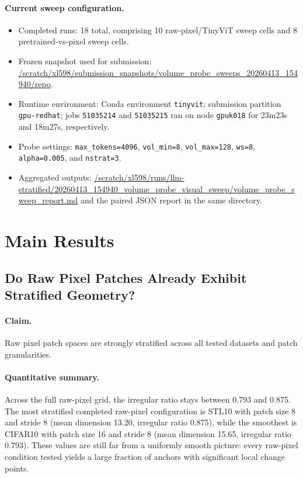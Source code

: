 \documentclass{article}
\newcommand{\dataset}[1]{\textsc{#1}}
\theoremstyle{definition}
\theoremstyle{plain}
\theoremstyle{remark}
\begin{document}
\paragraph{Current sweep configuration.}
\begin{itemize}[leftmargin=1.5em]
\item Completed runs: 18 total, comprising 10 raw-pixel/TinyViT sweep cells and 8 pretrained-vs-pixel sweep cells.
\item Frozen snapshot used for submission: \url{/scratch/xl598/submission_snapshots/volume_probe_sweeps_20260413_154940/repo}.
\item Runtime environment: Conda environment \texttt{tinyvit}; submission partition \texttt{gpu-redhat}; jobs \texttt{51035214} and \texttt{51035215} ran on node \texttt{gpuk018} for 23m23s and 18m27s, respectively.
\item Probe settings: \texttt{max\_tokens=4096}, \texttt{vol\_min=8}, \texttt{vol\_max=128}, \texttt{ws=8}, \texttt{alpha=0.005}, and \texttt{nstrat=3}.
\item Aggregated outputs: \url{/scratch/xl598/runs/llm-stratified/20260413_154940_volume_probe_visual_sweep/volume_probe_sweep_report.md} and the paired JSON report in the same directory.
\end{itemize}

\section{Main Results}
\label{sec:results}

\subsection{Do Raw Pixel Patches Already Exhibit Stratified Geometry?}
\paragraph{Claim.}
Raw pixel patch spaces are strongly stratified across all tested datasets and patch granularities.

\paragraph{Quantitative summary.}
Across the full raw-pixel grid, the irregular ratio stays between 0.793 and 0.875. The most stratified completed raw-pixel configuration is \dataset{STL10} with patch size 8 and stride 8 (mean dimension 13.20, irregular ratio 0.875), while the smoothest is \dataset{CIFAR10} with patch size 16 and stride 8 (mean dimension 15.65, irregular ratio 0.793). These values are still far from a uniformly smooth picture: every raw-pixel condition tested yields a large fraction of anchors with significant local change points.
\end{document}
